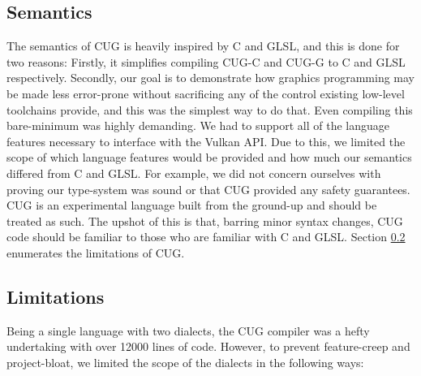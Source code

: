 \documentclass[a4paper,12pt,twoside,openright]{report}
\def\compilerloccount{12000 }
\begin{document}

\subsection{Semantics}

The semantics of CUG is heavily inspired by C and GLSL, and this is done for
two reasons: Firstly, it simplifies compiling CUG-C and CUG-G to C and GLSL
respectively. Secondly, our goal is to demonstrate how graphics programming may
be made less error-prone without sacrificing any of the control existing
low-level toolchains provide, and this was the simplest way to do that. Even
compiling this bare-minimum was highly demanding. We had to support all of the
language features necessary to interface with the Vulkan API. Due to this, we
limited the scope of which language features would be provided and how much our
semantics differed from C and GLSL. For example, we did not concern ourselves
with proving our type-system was sound or that CUG provided any safety
guarantees. CUG is an experimental language built from the ground-up and should
be treated as such. The upshot of this is that, barring minor syntax changes,
CUG code should be familiar to those who are familiar with C and GLSL. Section
\ref{subsec:limitations} enumerates the limitations of CUG.

\subsection{Limitations}

\label{subsec:limitations}

Being a single language with two dialects, the CUG compiler was a hefty
undertaking with over \compilerloccount lines of code. However, to prevent
feature-creep and project-bloat, we limited the scope of the dialects in the
following ways:
\end{document}

